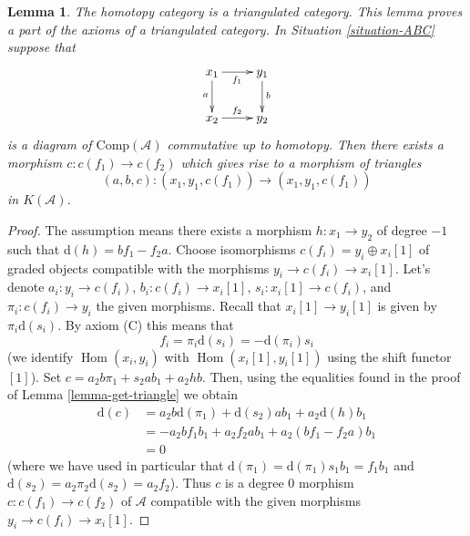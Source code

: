 \documentclass{stacks-project}
\newenvironment{slogan}{\comment}{\endcomment}
\theoremstyle{plain}
\newtheorem{lemma}[subsection]{Lemma}
\theoremstyle{definition}
\theoremstyle{remark}
\numberwithin{equation}{subsection}
\def\Hom{\mathop{\mathrm{Hom}}\nolimits}
\begin{document}
\begin{lemma}
\label{lemma-cone}
\begin{slogan}
The homotopy category is a triangulated category.
This lemma proves a part of the axioms of a triangulated category.
\end{slogan}
In Situation \ref{situation-ABC} suppose that
$$
\xymatrix{
x_1 \ar[r]_{f_1} \ar[d]_a & y_1 \ar[d]^b \\
x_2 \ar[r]^{f_2} & y_2
}
$$
is a diagram of $\text{Comp}(\mathcal{A})$ commutative up to homotopy.
Then there exists a morphism $c : c(f_1) \to c(f_2)$ which gives rise to
a morphism of triangles
$$
(a, b, c) : (x_1, y_1, c(f_1)) \to (x_1, y_1, c(f_1))
$$
in $K(\mathcal{A})$.
\end{lemma}

\begin{proof}
The assumption means there exists a morphism $h : x_1 \to y_2$ of degree
$-1$ such that $\text{d}(h) = b f_1 - f_2 a$. Choose isomorphisms
$c(f_i) = y_i \oplus x_i[1]$ of graded objects compatible with the
morphisms $y_i \to c(f_i) \to x_i[1]$. Let's denote
$a_i : y_i \to c(f_i)$, $b_i : c(f_i) \to x_i[1]$, $s_i : x_i[1] \to c(f_i)$,
and $\pi_i : c(f_i) \to y_i$ the given morphisms. Recall that
$x_i[1] \to y_i[1]$ is given by $\pi_i \text{d}(s_i)$. By axiom (C)
this means that
$$
f_i = \pi_i \text{d}(s_i) = - \text{d}(\pi_i) s_i
$$
(we identify $\Hom(x_i, y_i)$ with $\Hom(x_i[1], y_i[1])$
using the shift functor $[1]$).
Set $c = a_2 b \pi_1 + s_2 a b_1 + a_2hb$. Then, using the
equalities found in the proof of Lemma \ref{lemma-get-triangle}
we obtain
\begin{align*}
\text{d}(c)
& =
a_2 b \text{d}(\pi_1) + \text{d}(s_2) a b_1 + a_2 \text{d}(h) b_1 \\
& =
- a_2 b f_1 b_1 + a_2 f_2 a b_1 + a_2 (b f_1 - f_2 a) b_1 \\
& = 0
\end{align*}
(where we have used in particular that
$\text{d}(\pi_1) = \text{d}(\pi_1) s_1 b_1 = f_1 b_1$ and
$\text{d}(s_2) = a_2 \pi_2 \text{d}(s_2) = a_2 f_2$).
Thus $c$ is a degree $0$ morphism $c : c(f_1) \to c(f_2)$ of $\mathcal{A}$
compatible with the given morphisms $y_i \to c(f_i) \to x_i[1]$.
\end{proof}
\end{document}
